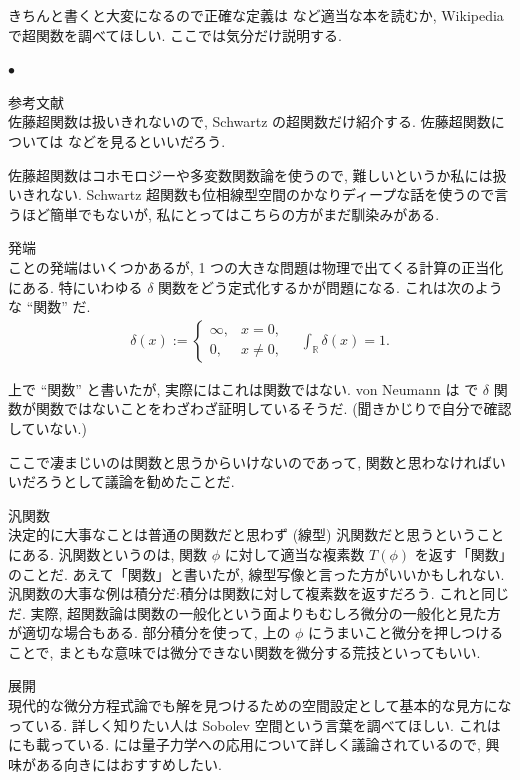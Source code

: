 \documentclass[openany, a4paper, oneside]{jsbook}
\newcounter{enum2}
\renewenvironment{itemize}{%
\begin{list}{$\bullet$\ \ }%
{%
\usecounter{enum2}
\setlength{\itemindent}{0pt}%
\setlength{\leftmargin}{15pt}%
\setlength{\rightmargin}{0pt}%
\setlength{\labelsep}{0pt}%
\setlength{\labelwidth}{6pt}%
\setlength{\itemsep}{0pt}%
\setlength{\parsep}{0pt}%
\setlength{\listparindent}{0pt}%
}
}{%
\end{list}%
}
\theoremstyle{break}
\theoremstyle{breakdefn}
\begin{document}
きちんと書くと大変になるので正確な定義は \cite{LiebLoss1} など適当な本を読むか, Wikipedia で超関数を調べてほしい.
ここでは気分だけ説明する.
\begin{itemize}

\item 参考文献\\
%
佐藤超関数は扱いきれないので, Schwartz の超関数だけ紹介する.
佐藤超関数については \cite{MitsuoMorimoto1} などを見るといいだろう.

佐藤超関数はコホモロジーや多変数関数論を使うので, 難しいというか私には扱いきれない.
Schwartz 超関数も位相線型空間のかなりディープな話を使うので言うほど簡単でもないが,
私にとってはこちらの方がまだ馴染みがある.

\item 発端\\
%
ことの発端はいくつかあるが, 1 つの大きな問題は物理で出てくる計算の正当化にある.
特にいわゆる $\delta$ 関数をどう定式化するかが問題になる.
これは次のような ``関数'' だ.
\begin{align}
 \delta (x)
 :=
 \begin{cases}
  \infty, & x = 0, \\
  0, & x \neq 0,
 \end{cases} \quad
 \int_{\mathbb{R}} \delta (x) = 1.
\end{align}

上で ``関数'' と書いたが, 実際にはこれは関数ではない.
von Neumann は \cite{vonNeumann1} で $\delta$ 関数が関数ではないことをわざわざ証明しているそうだ.
(聞きかじりで自分で確認していない.)

ここで凄まじいのは関数と思うからいけないのであって,
関数と思わなければいいだろうとして議論を勧めたことだ.

\item 汎関数\\
%
決定的に大事なことは普通の関数だと思わず (線型) 汎関数だと思うということにある.
汎関数というのは, 関数 $\phi$ に対して適当な複素数 $T (\phi)$ を返す「関数」のことだ.
あえて「関数」と書いたが, 線型写像と言った方がいいかもしれない.
汎関数の大事な例は積分だ:積分は関数に対して複素数を返すだろう.
これと同じだ.
実際, 超関数論は関数の一般化という面よりもむしろ微分の一般化と見た方が適切な場合もある.
部分積分を使って, 上の $\phi$ にうまいこと微分を押しつけることで,
まともな意味では微分できない関数を微分する荒技といってもいい.

\item 展開\\
%
現代的な微分方程式論でも解を見つけるための空間設定として基本的な見方になっている.
詳しく知りたい人は Sobolev 空間という言葉を調べてほしい.
これは \cite{LiebLoss1} にも載っている.
\cite{LiebLoss1} には量子力学への応用について詳しく議論されているので, 興味がある向きにはおすすめしたい.
\end{itemize} %
\end{document}
